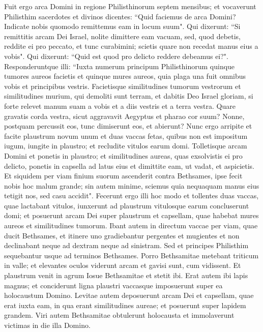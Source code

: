 \begin{biblechapter}  
\verse Fuit ergo arca Domini in regione Philisthinorum septem mensibus; 
\verse et vocaverunt Philisthim sacerdotes et divinos dicentes: “Quid faciemus de arca Domini? Indicate nobis quomodo remittemus eam in locum suum". Qui dixerunt: 
\verse “Si remittitis arcam Dei Israel, nolite dimittere eam vacuam, sed, quod debetis, reddite ei pro peccato, et tunc curabimini; scietis quare non recedat manus eius a vobis". 
\verse Qui dixerunt: “Quid est quod pro delicto reddere debeamus ei?". Responderuntque illi: 
\verse “Iuxta numerum principum Philisthinorum quinque tumores aureos facietis et quinque mures aureos, quia plaga una fuit omnibus vobis et principibus vestris. Facietisque similitudines tumorum vestrorum et similitudines murium, qui demoliti sunt terram, et dabitis Deo Israel gloriam, si forte relevet manum suam a vobis et a diis vestris et a terra vestra. 
\verse Quare gravatis corda vestra, sicut aggravavit Aegyptus et pharao cor suum? Nonne, postquam percussit eos, tunc dimiserunt eos, et abierunt? 
\verse Nunc ergo arripite et facite plaustrum novum unum et duas vaccas fetas, quibus non est impositum iugum, iungite in plaustro; et recludite vitulos earum domi. 
\verse Tolletisque arcam Domini et ponetis in plaustro; et similitudines aureas, quas exsolvistis ei pro delicto, ponetis in capsella ad latus eius et dimittite eam, ut vadat, 
\verse et aspicietis. Et siquidem per viam finium suorum ascenderit contra Bethsames, ipse fecit nobis hoc malum grande; sin autem minime, sciemus quia nequaquam manus eius tetigit nos, sed casu accidit". 
\verse Fecerunt ergo illi hoc modo et tollentes duas vaccas, quae lactabant vitulos, iunxerunt ad plaustrum vitulosque earum concluserunt domi; 
\verse et posuerunt arcam Dei super plaustrum et capsellam, quae habebat mures aureos et similitudines tumorum. 
\verse Ibant autem in directum vaccae per viam, quae ducit Bethsames, et itinere uno gradiebantur pergentes et mugientes et non declinabant neque ad dextram neque ad sinistram. Sed et principes Philisthim sequebantur usque ad terminos Bethsames. 
\verse Porro Bethsamitae metebant triticum in valle; et elevantes oculos viderunt arcam et gavisi sunt, cum vidissent. 
\verse Et plaustrum venit in agrum Iosue Bethsamitae et stetit ibi. Erat autem ibi lapis magnus; et conciderunt ligna plaustri vaccasque imposuerunt super ea holocaustum Domino. 
\verse Levitae autem deposuerunt arcam Dei et capsellam, quae erat iuxta eam, in qua erant similitudines aureae; et posuerunt super lapidem grandem. Viri autem Bethsamitae obtulerunt holocausta et immolaverunt victimas in die illa Domino. 

\end{biblechapter}
